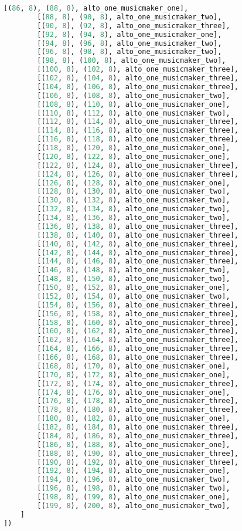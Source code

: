 \begin{lstlisting}[language=Python, caption=Invocation Source Code]
        [(86, 8), (88, 8), alto_one_musicmaker_one],
        [(88, 8), (90, 8), alto_one_musicmaker_two],
        [(90, 8), (92, 8), alto_one_musicmaker_three],
        [(92, 8), (94, 8), alto_one_musicmaker_one],
        [(94, 8), (96, 8), alto_one_musicmaker_two],
        [(96, 8), (98, 8), alto_one_musicmaker_two],
        [(98, 8), (100, 8), alto_one_musicmaker_two],
        [(100, 8), (102, 8), alto_one_musicmaker_three],
        [(102, 8), (104, 8), alto_one_musicmaker_three],
        [(104, 8), (106, 8), alto_one_musicmaker_three],
        [(106, 8), (108, 8), alto_one_musicmaker_two],
        [(108, 8), (110, 8), alto_one_musicmaker_one],
        [(110, 8), (112, 8), alto_one_musicmaker_two],
        [(112, 8), (114, 8), alto_one_musicmaker_three],
        [(114, 8), (116, 8), alto_one_musicmaker_three],
        [(116, 8), (118, 8), alto_one_musicmaker_three],
        [(118, 8), (120, 8), alto_one_musicmaker_one],
        [(120, 8), (122, 8), alto_one_musicmaker_one],
        [(122, 8), (124, 8), alto_one_musicmaker_three],
        [(124, 8), (126, 8), alto_one_musicmaker_three],
        [(126, 8), (128, 8), alto_one_musicmaker_one],
        [(128, 8), (130, 8), alto_one_musicmaker_two],
        [(130, 8), (132, 8), alto_one_musicmaker_two],
        [(132, 8), (134, 8), alto_one_musicmaker_two],
        [(134, 8), (136, 8), alto_one_musicmaker_two],
        [(136, 8), (138, 8), alto_one_musicmaker_three],
        [(138, 8), (140, 8), alto_one_musicmaker_three],
        [(140, 8), (142, 8), alto_one_musicmaker_three],
        [(142, 8), (144, 8), alto_one_musicmaker_three],
        [(144, 8), (146, 8), alto_one_musicmaker_three],
        [(146, 8), (148, 8), alto_one_musicmaker_two],
        [(148, 8), (150, 8), alto_one_musicmaker_two],
        [(150, 8), (152, 8), alto_one_musicmaker_one],
        [(152, 8), (154, 8), alto_one_musicmaker_two],
        [(154, 8), (156, 8), alto_one_musicmaker_three],
        [(156, 8), (158, 8), alto_one_musicmaker_three],
        [(158, 8), (160, 8), alto_one_musicmaker_three],
        [(160, 8), (162, 8), alto_one_musicmaker_three],
        [(162, 8), (164, 8), alto_one_musicmaker_three],
        [(164, 8), (166, 8), alto_one_musicmaker_three],
        [(166, 8), (168, 8), alto_one_musicmaker_three],
        [(168, 8), (170, 8), alto_one_musicmaker_one],
        [(170, 8), (172, 8), alto_one_musicmaker_one],
        [(172, 8), (174, 8), alto_one_musicmaker_three],
        [(174, 8), (176, 8), alto_one_musicmaker_one],
        [(176, 8), (178, 8), alto_one_musicmaker_three],
        [(178, 8), (180, 8), alto_one_musicmaker_three],
        [(180, 8), (182, 8), alto_one_musicmaker_one],
        [(182, 8), (184, 8), alto_one_musicmaker_three],
        [(184, 8), (186, 8), alto_one_musicmaker_three],
        [(186, 8), (188, 8), alto_one_musicmaker_one],
        [(188, 8), (190, 8), alto_one_musicmaker_three],
        [(190, 8), (192, 8), alto_one_musicmaker_three],
        [(192, 8), (194, 8), alto_one_musicmaker_one],
        [(194, 8), (196, 8), alto_one_musicmaker_two],
        [(196, 8), (198, 8), alto_one_musicmaker_two],
        [(198, 8), (199, 8), alto_one_musicmaker_one],
        [(199, 8), (200, 8), alto_one_musicmaker_two],
    ]
])


\end{lstlisting}
